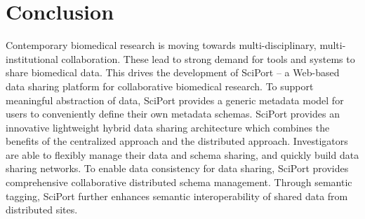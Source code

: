 \documentclass{doublecol-new}
\theoremstyle{TH}{
\newtheorem{lemma}{Lemma}
\newtheorem{theorem}[lemma]{Theorem}
\newtheorem{corrolary}[lemma]{Corrolary}
\newtheorem{conjecture}[lemma]{Conjecture}
\newtheorem{proposition}[lemma]{Proposition}
\newtheorem{claim}[lemma]{Claim}
\newtheorem{stheorem}[lemma]{Wrong Theorem}
\newtheorem{algorithm}{Algorithm}
}
\theoremstyle{THrm}{
\newtheorem{definition}{Definition}[section]
\newtheorem{question}{Question}[section]
\newtheorem{remark}{Remark}
\newtheorem{scheme}{Scheme}
}
\theoremstyle{THhit}{
\newtheorem{case}{Case}[section]
}
\begin{document}
\section{Conclusion}

Contemporary biomedical research is moving towards
multi-disciplinary, multi-institutional collaboration. These lead to
strong demand for tools and systems to share biomedical data. This
drives the development of SciPort -- a Web-based data sharing
platform for collaborative biomedical research. To support
meaningful abstraction of data, SciPort provides a generic metadata
model for users to conveniently define their own metadata schemas.
SciPort provides an innovative lightweight hybrid data sharing
architecture which combines the benefits of the centralized approach
and the distributed approach. Investigators are able to flexibly
manage their data and schema sharing, and quickly build data sharing
networks. To enable data consistency for data sharing, SciPort
provides comprehensive collaborative distributed schema management.
Through semantic tagging, SciPort further enhances semantic
interoperability of shared data from distributed sites.




%
%
%
\end{document}
